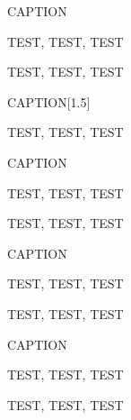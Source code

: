 \begin{simplesquarebox}{CAPTION}

TEST, TEST, TEST

\end{simplesquarebox}

\begin{simplesquarebox}{}

TEST, TEST, TEST

\end{simplesquarebox}

\begin{simplesquarebox}{CAPTION}[1.5]

TEST, TEST, TEST

\end{simplesquarebox}

\begin{practicebox}{CAPTION}

TEST, TEST, TEST

\end{practicebox}

\begin{practicebox}{}

TEST, TEST, TEST

\end{practicebox}

\begin{ascolorbox1}{CAPTION}

TEST, TEST, TEST

\end{ascolorbox1}

\begin{ascolorbox1}{}

TEST, TEST, TEST

\end{ascolorbox1}

\begin{ascolorbox2}{CAPTION}

TEST, TEST, TEST

\end{ascolorbox2}

\begin{ascolorbox2}{}

TEST, TEST, TEST

\end{ascolorbox2}

